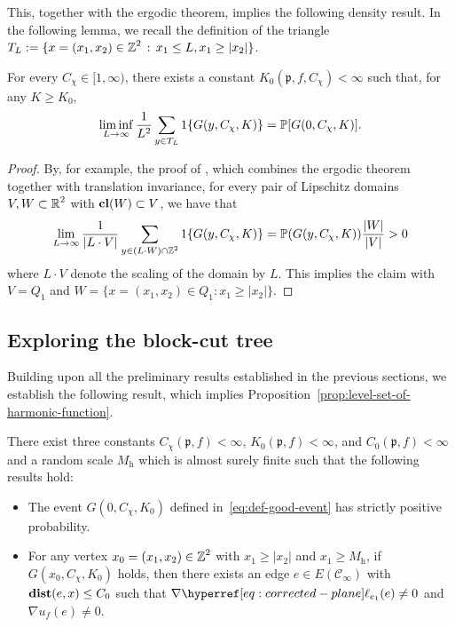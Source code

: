 \documentclass[12pt]{amsart}
\numberwithin{equation}{section}
\begin{document}
	
	This, together with the ergodic theorem, implies the following density result. In the following lemma, we recall the definition of the triangle $T_L := \{ x = (x_1 , x_2) \in \Z^2 \, : \, x_1 \leq L, x_1 \geq |x_2|\}$.
	
	\begin{lemma} \label{lemma:density-bound-good-event}
		For every $C_{\chi} \in [1 , \infty)$, there exists a constant $K_0(\mathfrak{p} , f , C_\chi) < \infty$ such that, for any $K \geq K_0$, 
		\begin{equation*}
			\liminf_{L \to \infty} \frac{1}{L^2}\sum_{y \in T_L}1\{ {G(y , C_\chi , K)}\} =  \P[G(0 , C_\chi , K )].
		\end{equation*}
	\end{lemma}
	\begin{proof}
		By, for example, the proof of \cite[Lemma 3.2]{ergodic-theorem-lemma}, which combines the ergodic theorem together with translation invariance, 
		for every pair of Lipschitz domains $V,W \subset \R^2$ with $\cl(W) \subset V$, we have that 
		\begin{equation} \label{eq:spreads-evenly}
			\lim_{L \to \infty} \frac{1}{|L \cdot V|} \sum_{y \in (L \cdot W) \cap \Z^2} 1\{ {G(y , C_\chi , K)}\}  
			= \P( G(y , C_\chi , K)) \frac{|W|}{|V|}
			> 0
		\end{equation}
		where $L \cdot V$ denote the scaling of the domain by $L$. This implies the claim with $V = Q_1$ and $W = \{ x = (x_1 , x_2) \in Q_1 : x_1 \geq |x_2| \}$.
	\end{proof}
	
	
	
	\subsection{Exploring the block-cut tree}
	Building upon all the preliminary results established in the previous sections, we establish the following result, which implies Proposition~\ref{prop:level-set-of-harmonic-function}.
	\begin{lemma} \label{lemma:large-gradient-implies-not-in-level-set}
		There exist three constants $C_\chi (\mathfrak{p}, f) < \infty$, $K_0(\mathfrak{p} , f) < \infty$, and $C_0(\mathfrak{p} , f) < \infty$ and a random scale $M_{\mathrm{h}}$ which is almost surely finite such that the following results hold:
		\begin{itemize}
			\item[(i)] The event $G(0, C_\chi , K_0)$ defined in~\eqref{eq:def-good-event} has strictly positive probability.
			\item[(ii)] For any vertex $x_0 = (x_1 , x_2) \in \Z^2$ with $x_1 \geq |x_2|$ and $x_1 \geq M_{\mathrm{h}}$, if $G(x_0, C_\chi , K_0)$ holds, then there exists an edge $e \in E \left( \mathscr{C}_\infty \right)$ with $\dist(e , x) \leq C_0$ such that $ \nabla \ellp{e_1} (e) \neq 0$ and $\nabla u_f(e) \neq 0$.
		\end{itemize}
	\end{lemma}
	
\end{document}
